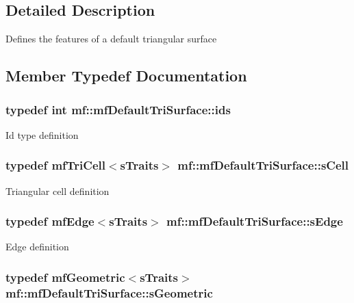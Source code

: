 \subsection{Detailed Description}
Defines the features of a default triangular surface 

\subsection{Member Typedef Documentation}
\hypertarget{structmf_1_1mfDefaultTriSurface_ae35bbc7e78b5e343253df5ac864f5b84}{
\subsubsection[{ids}]{\setlength{\rightskip}{0pt plus 5cm}typedef int {\bf mf::mfDefaultTriSurface::ids}}}
\label{structmf_1_1mfDefaultTriSurface_ae35bbc7e78b5e343253df5ac864f5b84}
Id type definition \hypertarget{structmf_1_1mfDefaultTriSurface_ac440261ed211ca9d7ca2b93b58c3cf32}{
\subsubsection[{sCell}]{\setlength{\rightskip}{0pt plus 5cm}typedef {\bf mfTriCell}$<${\bf sTraits}$>$ {\bf mf::mfDefaultTriSurface::sCell}}}
\label{structmf_1_1mfDefaultTriSurface_ac440261ed211ca9d7ca2b93b58c3cf32}
Triangular cell definition \hypertarget{structmf_1_1mfDefaultTriSurface_ab9b21363dec8397617e08815969e2e74}{
\subsubsection[{sEdge}]{\setlength{\rightskip}{0pt plus 5cm}typedef {\bf mfEdge}$<${\bf sTraits}$>$ {\bf mf::mfDefaultTriSurface::sEdge}}}
\label{structmf_1_1mfDefaultTriSurface_ab9b21363dec8397617e08815969e2e74}
Edge definition \hypertarget{structmf_1_1mfDefaultTriSurface_a6b9571826473f2d8c08f7f7d088237ea}{
\subsubsection[{sGeometric}]{\setlength{\rightskip}{0pt plus 5cm}typedef {\bf mfGeometric}$<${\bf sTraits}$>$ {\bf mf::mfDefaultTriSurface::sGeometric}}}
